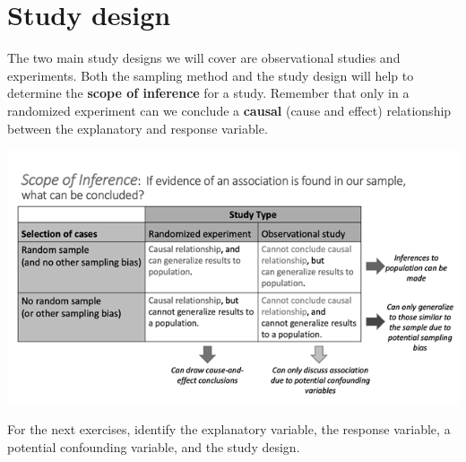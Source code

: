 \documentclass[
]{report}
\begin{document}
\newpage

\hypertarget{study-design-1}{%
\section{Study design}\label{study-design-1}}

The two main study designs we will cover are observational studies and experiments. Both the sampling method and the study design will help to determine the \textbf{scope of inference} for a study. Remember that only in a randomized experiment can we conclude a \textbf{causal} (cause and effect) relationship between the explanatory and response variable.

\begin{center}\includegraphics[width=0.75\linewidth]{images/ScopeOfInferenceGreyscale} \end{center}

For the next exercises, identify the explanatory variable, the response variable, a potential confounding variable, and the study design.
\end{document}
